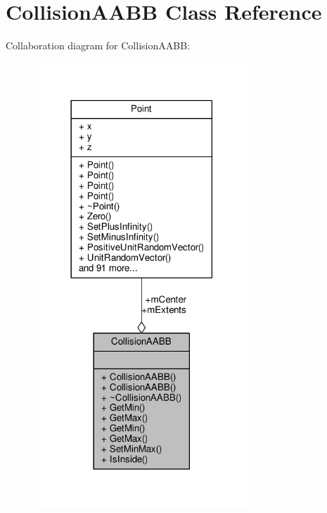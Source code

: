 \hypertarget{classCollisionAABB}{}\section{Collision\+A\+A\+BB Class Reference}
\label{classCollisionAABB}


Collaboration diagram for Collision\+A\+A\+BB\+:
\nopagebreak
\begin{figure}[H]
\begin{center}
\leavevmode
\includegraphics[width=230pt]{d4/d2e/classCollisionAABB__coll__graph}
\end{center}
\end{figure}
